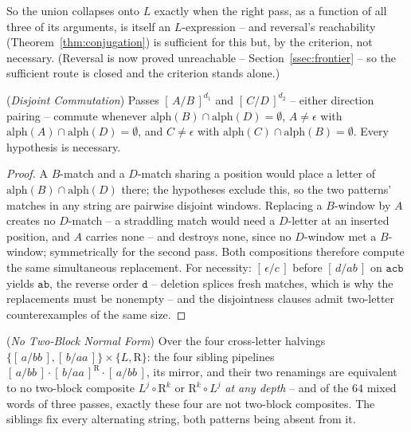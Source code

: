 \documentclass[runningheads,envcountsect]{llncs}
\begin{document}
So the union collapses onto $L$ exactly when the right pass, as a function of all three of its arguments, is itself an $L$-expression -- and reversal's reachability (Theorem~\ref{thm:conjugation}) is sufficient for this but, by the criterion, not necessary. (Reversal is now proved unreachable -- Section~\ref{ssec:frontier} -- so the sufficient route is closed and the criterion stands alone.)

\begin{lemma}
    (\emph{Disjoint Commutation})
    \label{lem:disjoint-comm}
    Passes $[\,A/B\,]^{d_1}$ and $[\,C/D\,]^{d_2}$ -- either direction pairing -- commute whenever $\mathrm{alph}(B) \cap \mathrm{alph}(D) = \emptyset$, $A \neq \epsilon$ with $\mathrm{alph}(A) \cap \mathrm{alph}(D) = \emptyset$, and $C \neq \epsilon$ with $\mathrm{alph}(C) \cap \mathrm{alph}(B) = \emptyset$. Every hypothesis is necessary.
\end{lemma}

\begin{proof}
    A $B$-match and a $D$-match sharing a position would place a letter of $\mathrm{alph}(B) \cap \mathrm{alph}(D)$ there; the hypotheses exclude this, so the two patterns' matches in any string are pairwise disjoint windows. Replacing a $B$-window by $A$ creates no $D$-match -- a straddling match would need a $D$-letter at an inserted position, and $A$ carries none -- and destroys none, since no $D$-window met a $B$-window; symmetrically for the second pass. Both compositions therefore compute the same simultaneous replacement. For necessity: $[\,\epsilon/c\,]$ before $[\,d/ab\,]$ on $\mathtt{acb}$ yields $\mathtt{ab}$, the reverse order $\mathtt{d}$ -- deletion splices fresh matches, which is why the replacements must be nonempty -- and the disjointness clauses admit two-letter counterexamples of the same size.
\end{proof}

\begin{proposition}
    (\emph{No Two-Block Normal Form})
    \label{prop:no-2block}
    Over the four cross-letter halvings $\{[\,a/bb\,], [\,b/aa\,]\} \times \{L, \mathrm{R}\}$: the four sibling pipelines $[\,a/bb\,] \cdot [\,b/aa\,]^{\mathrm{R}} \cdot [\,a/bb\,]$, its mirror, and their two renamings are equivalent to no two-block composite $L^j \circ \mathrm{R}^k$ or $\mathrm{R}^k \circ L^j$ \emph{at any depth} -- and of the $64$ mixed words of three passes, exactly these four are not two-block composites. The siblings fix every alternating string, both patterns being absent from it.
\end{proposition}
\end{document}
